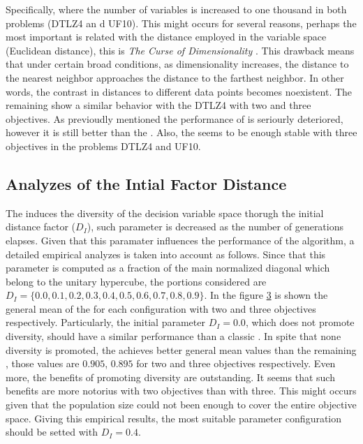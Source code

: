 %
Specifically, where the number of variables is increased to one thousand in both problems (DTLZ4 an d UF10).
%
This might occurs for several reasons, perhaps the most important is related with the distance employed in the variable space (Euclidean distance), this is \textit{The Curse of Dimensionality} \cite{trunk1979problem, beyer1999nearest}.
%
This drawback means that under certain broad conditions, as dimensionality increases, the distance to the nearest neighbor approaches the distance to the farthest neighbor.
%
In other words, the contrast in distances to different data points becomes noexistent.
%
The remaining \MOEAS{} show a similar behavior with the DTLZ4 with two and three objectives.
%
As previoudly mentioned the performance of \VSDMOEA{} is seriourly deteriored, however it is still better than the \NSGAII{}.
%
Also, the \RMOEA{} seems to be enough stable with three objectives in the problems DTLZ4 and UF10.

\begin{figure}[t]
\centering

\label{fig:variable-decision-scalability-2obj}
\end{figure}

\begin{figure}[t]
\centering

\label{fig:variable-decision-scalability-3obj}
\end{figure}

\subsection{Analyzes of the Intial Factor Distance}

The \VSDMOEA{} induces the diversity of the decision variable space thorugh the initial distance factor ($D_I$), such parameter is decreased as the number of generations elapses.
%
Given that this paramater influences the performance of the algorithm, a detailed empirical analyzes is taken into account as follows.
%
Since that this parameter is computed as a fraction of the main normalized diagonal which belong to the unitary hypercube, the portions considered are $ D_I = \{0.0, 0.1, 0.2, 0.3, 0.4, 0.5, 0.6, 0.7, 0.8, 0.9\}$.
%
In the figure \ref{fig:Initial-distance-factor} is shown the general mean of the \HV{} for each configuration with two and three objectives respectively.
%
Particularly, the initial parameter $D_I=0.0$, which does not promote diversity, should have a similar performance than a classic \MOEA{}.
%
In spite that none diversity is promoted, the \VSDMOEA{} achieves better general mean values than the remaining \MOEAS{}, those values are $0.905$, $0.895$ for two and three objectives respectively.
%
Even more, the benefits of promoting diversity are outstanding.
%
It seems that such benefits are more notorius with two objectives than with three.
%
This might occurs given that the population size could not been enough to cover the entire objective space.
%
Giving this empirical results, the most suitable parameter configuration should be setted with $D_I = 0.4$.
%
\begin{figure}[t]
\centering

\label{fig:Initial-distance-factor}
\end{figure}

